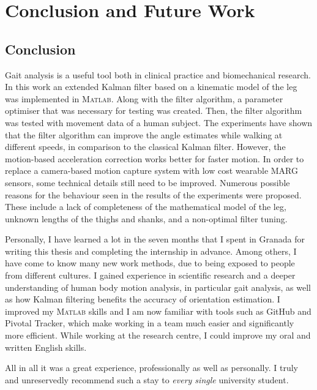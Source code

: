 \chapter{Conclusion and Future Work}
\label{ch:Conclusion and Future Work}

\section{Conclusion}

Gait analysis is a useful tool both in clinical practice and biomechanical research. In this work an extended Kalman filter based on a kinematic model of the leg was implemented in \textsc{Matlab}\textsuperscript{\textregistered}. Along with the filter algorithm, a parameter optimiser that was necessary for testing was created. Then, the filter algorithm was tested with movement data of a human subject. The experiments have shown that the filter algorithm can improve the angle estimates while walking at different speeds, in comparison to the classical Kalman filter.
However, the motion-based acceleration correction works better for faster motion. In order to replace a camera-based motion capture system with low cost wearable MARG sensors, some technical details still need to be improved. Numerous possible reasons for the behaviour seen in the results of the experiments were proposed. These include a lack of completeness of the mathematical model of the leg, unknown lengths of the thighs and shanks, and a non-optimal filter tuning.

Personally, I have learned a lot in the seven months that I spent in Granada for writing this thesis and completing the internship in advance. Among others, I have come to know many new work methods, due to being exposed to people from different cultures. I gained experience in scientific research and a deeper understanding of human body motion analysis, in particular gait analysis, as well as how Kalman filtering benefits the accuracy of orientation estimation. I improved my \textsc{Matlab}\textsuperscript{\textregistered} skills and I am now familiar with tools such as GitHub and Pivotal Tracker, which make working in a team much easier and significantly more efficient.  While working at the research centre, I could improve my oral and written English skills.

All in all it was a great experience, professionally as well as personally. I truly and unreservedly recommend such a stay to \emph{every single} university student.

